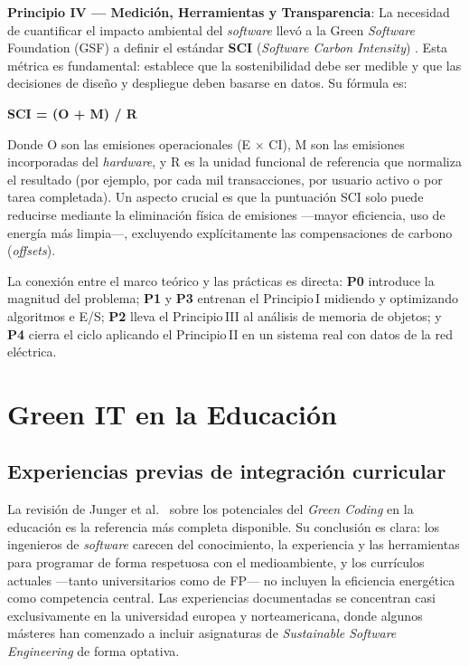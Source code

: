 \textbf{Principio IV — Medición, Herramientas y Transparencia}: La necesidad de cuantificar el impacto ambiental del \textit{software} llevó a la Green \textit{Software} Foundation (GSF) a definir el estándar \textbf{SCI} (\textit{Software Carbon Intensity}) \cite{greensoftwarefoundation2022sci}. Esta métrica es fundamental: establece que la sostenibilidad debe ser medible y que las decisiones de diseño y despliegue deben basarse en datos. Su fórmula es:


\textbf{SCI = (O + M) / R}


Donde O son las emisiones operacionales (E $\times$ CI), M son las emisiones incorporadas del \textit{hardware}, y R es la unidad funcional de referencia que normaliza el resultado (por ejemplo, por cada mil transacciones, por usuario activo o por tarea completada). Un aspecto crucial es que la puntuación SCI solo puede reducirse mediante la eliminación física de emisiones —mayor eficiencia, uso de energía más limpia—, excluyendo explícitamente las compensaciones de carbono (\textit{offsets}).


La conexión entre el marco teórico y las prácticas es directa: \textbf{P0} introduce la magnitud del problema; \textbf{P1} y \textbf{P3} entrenan el Principio\,I midiendo y optimizando algoritmos e E/S; \textbf{P2} lleva el Principio\,III al análisis de memoria de objetos; y \textbf{P4} cierra el ciclo aplicando el Principio\,II en un sistema real con datos de la red eléctrica.




\section{Green IT en la Educación}


\subsection{Experiencias previas de integración curricular}


La revisión de Junger et al.~\cite{junger2024potentials} sobre los potenciales del \textit{Green Coding} en la educación es la referencia más completa disponible. Su conclusión es clara: los ingenieros de \textit{software} carecen del conocimiento, la experiencia y las herramientas para programar de forma respetuosa con el medioambiente, y los currículos actuales —tanto universitarios como de FP— no incluyen la eficiencia energética como competencia central. Las experiencias documentadas se concentran casi exclusivamente en la universidad europea y norteamericana, donde algunos másteres han comenzado a incluir asignaturas de \textit{Sustainable Software Engineering} de forma optativa.


